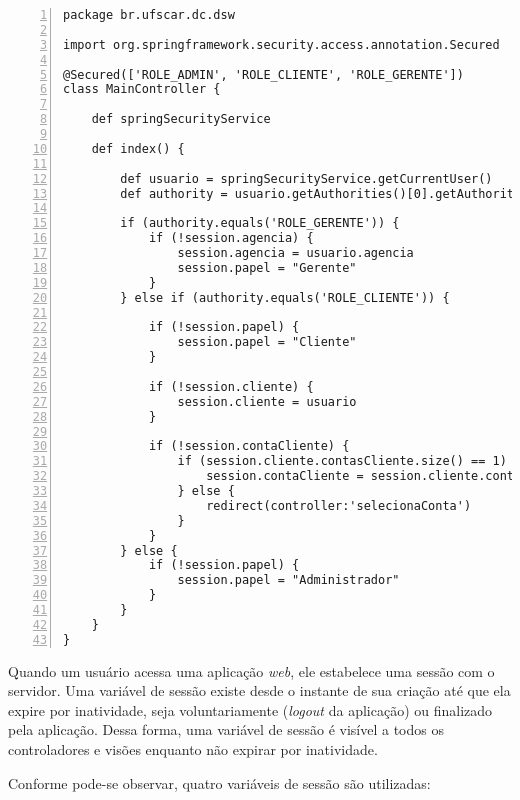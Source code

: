 \begin{lstlisting}[caption=Controlador    {\bf    MainController},   frame=trBL,
    float=htbp, label=codMainController2, numbers=left] 
package br.ufscar.dc.dsw

import org.springframework.security.access.annotation.Secured

@Secured(['ROLE_ADMIN', 'ROLE_CLIENTE', 'ROLE_GERENTE'])
class MainController {

    def springSecurityService
    
    def index() { 
    
        def usuario = springSecurityService.getCurrentUser() 
        def authority = usuario.getAuthorities()[0].getAuthority()
        
        if (authority.equals('ROLE_GERENTE')) {
            if (!session.agencia) {
                session.agencia = usuario.agencia
                session.papel = "Gerente"
            }
        } else if (authority.equals('ROLE_CLIENTE')) {
            
            if (!session.papel) {
                session.papel = "Cliente"
            }
            
            if (!session.cliente) {
                session.cliente = usuario
            }
                        
            if (!session.contaCliente) {
                if (session.cliente.contasCliente.size() == 1) {
                    session.contaCliente = session.cliente.contasCliente[0]
                } else {
                    redirect(controller:'selecionaConta')
                }
            }
        } else {
            if (!session.papel) {
                session.papel = "Administrador"
            }
        }
    }
}
\end{lstlisting}

Quando um usuário acessa uma aplicação  {\it web}, ele estabelece uma sessão com
o servidor.  Uma variável de sessão existe  desde o instante de  sua criação até
que ela expire por inatividade, seja voluntariamente ({\it logout} da aplicação)
ou finalizado pela  aplicação.  Dessa forma, uma variável de  sessão é visível a
todos os controladores e visões enquanto não expirar por inatividade. 

\newpage

Conforme pode-se observar, quatro variáveis de sessão são utilizadas: 

\vspace{0.5cm}

